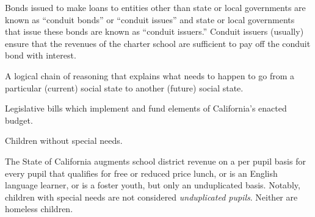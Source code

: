 \begin{description}[nosep]
\medskip\item[tax-exempt conduit bonds] Bonds issued to make loans to entities other than state or local governments are known as
“conduit bonds” or “conduit issues” and state or local governments that issue these bonds are known as “conduit issuers.” Conduit issuers (usually) ensure that the revenues of the charter school are sufficient to pay off the conduit bond with interest.

\medskip\item[theory of action] A logical chain of reasoning that explains what needs to happen to go from a particular (current) social state to another (future) social state.

\medskip\item[trailer bills] Legislative bills which implement and fund elements of California's enacted budget.

\medskip\item[typical or neuro-typical children] Children without special needs.

\medskip\item[unduplicated pupils] The State of California augments school district revenue on a per pupil basis for every pupil that qualifies for free or reduced price lunch, or is an English language learner, or is a foster youth, but only an unduplicated basis. Notably, children with special needs are not considered \textit{unduplicated pupils}. Neither are homeless children.

\end{description}

